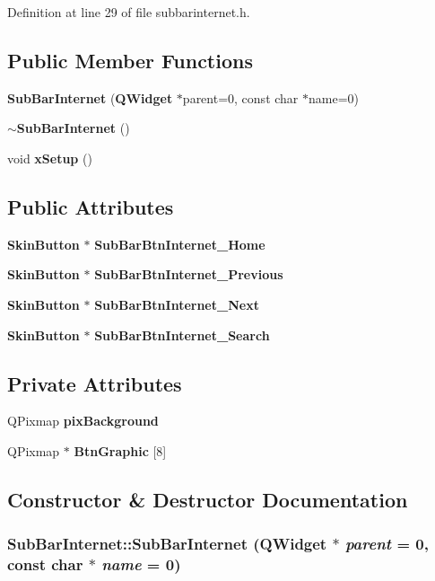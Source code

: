 Definition at line 29 of file subbarinternet.h.\subsection*{Public Member Functions}
\begin{CompactItemize}
\item 
{\bf Sub\-Bar\-Internet} ({\bf QWidget} $\ast$parent=0, const char $\ast$name=0)
\item 
{\bf $\sim$Sub\-Bar\-Internet} ()
\item 
void {\bf x\-Setup} ()
\end{CompactItemize}
\subsection*{Public Attributes}
\begin{CompactItemize}
\item 
{\bf Skin\-Button} $\ast$ {\bf Sub\-Bar\-Btn\-Internet\_\-Home}
\item 
{\bf Skin\-Button} $\ast$ {\bf Sub\-Bar\-Btn\-Internet\_\-Previous}
\item 
{\bf Skin\-Button} $\ast$ {\bf Sub\-Bar\-Btn\-Internet\_\-Next}
\item 
{\bf Skin\-Button} $\ast$ {\bf Sub\-Bar\-Btn\-Internet\_\-Search}
\end{CompactItemize}
\subsection*{Private Attributes}
\begin{CompactItemize}
\item 
QPixmap {\bf pix\-Background}
\item 
QPixmap $\ast$ {\bf Btn\-Graphic} [8]
\end{CompactItemize}


\subsection{Constructor \& Destructor Documentation}
\subsubsection{\setlength{\rightskip}{0pt plus 5cm}Sub\-Bar\-Internet::Sub\-Bar\-Internet ({\bf QWidget} $\ast$ {\em parent} = 0, const char $\ast$ {\em name} = 0)}\label{classSubBarInternet_SubBarInterneta0}




